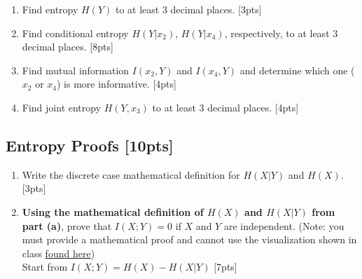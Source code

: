 \documentclass{article}
\begin{document}
\begin{enumerate}[label=(\alph*)]
    \item Find entropy $H(Y)$ to at least 3 decimal places. [3pts]

    \item Find conditional entropy $H(Y|x_2)$, $H(Y|x_4)$, respectively, to at least 3 decimal places. [8pts]

    \item Find mutual information $I(x_2, Y)$ and $I(x_4, Y)$ and determine which one ($x_2$ or $x_4$) is more informative. [4pts]
    \item Find joint entropy $H(Y, x_3)$ to at least 3 decimal places. [4pts]
\end{enumerate}


\newpage
\subsection{Entropy Proofs [10pts]}
\begin{enumerate}[label=(\alph*)]
    \item Write the discrete case mathematical definition for $H(X|Y)$ and $H(X)$. [3pts]
    
    \item \textbf{Using the mathematical definition of $H(X)$ and $H(X|Y)$ from part (a)}, prove that $I(X;Y) = 0$ if $X$ and $Y$ are independent. (Note: you must provide a mathematical proof and cannot use the visualization shown in class \href{https://mahdi-roozbahani.github.io/CS46417641-summer2022/other/CEandMI_Illustration.jpg}{found here})  \\
    \newline
    Start from $I(X;Y) = H(X)-H(X|Y)$ [7pts]
\end{enumerate}


\newpage
\end{document}
